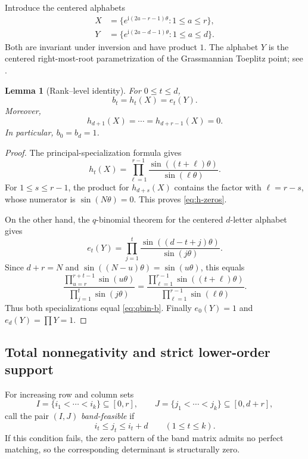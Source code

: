 \documentclass[11pt]{amsart}
\newtheorem{lemma}[theorem]{Lemma}
\theoremstyle{definition}
\theoremstyle{remark}
\begin{document}
Introduce the centered alphabets
\begin{align}
 X&=\bigl\{e^{\mathrm i(2a-r-1)\theta}:1\le a\le r\bigr\},\label{eq:X-alphabet}\\
 Y&=\bigl\{e^{\mathrm i(2a-d-1)\theta}:1\le a\le d\bigr\}.
 \label{eq:Y-alphabet}
\end{align}
Both are invariant under inversion and have product $1$.  The alphabet $Y$ is the centered right-most-root parametrization of the Grassmannian Toeplitz point; see \cite{RietschGrassmannian,ChungHalpernRietsch}.

\begin{lemma}[Rank--level identity]\label{lem:rank-level}
For $0\le t\le d$,
\begin{equation}\label{eq:rank-level-id}
 b_t=h_t(X)=e_t(Y).
\end{equation}
Moreover,
\begin{equation}\label{eq:h-zeros}
 h_{d+1}(X)=\cdots=h_{d+r-1}(X)=0.
\end{equation}
In particular, $b_0=b_d=1$.
\end{lemma}

\begin{proof}
The principal-specialization formula gives
\[
 h_t(X)=\prod_{\ell=1}^{r-1}
 \frac{\sin((t+\ell)\theta)}{\sin(\ell\theta)}.
\]
For $1\le s\le r-1$, the product for $h_{d+s}(X)$ contains the factor with $\ell=r-s$, whose numerator is $\sin(N\theta)=0$.  This proves \eqref{eq:h-zeros}.

On the other hand, the $q$-binomial theorem for the centered $d$-letter alphabet gives
\[
 e_t(Y)=\prod_{j=1}^t
 \frac{\sin((d-t+j)\theta)}{\sin(j\theta)}.
\]
Since $d+r=N$ and $\sin((N-u)\theta)=\sin(u\theta)$, this equals
\[
 \frac{\prod_{u=r}^{r+t-1}\sin(u\theta)}
 {\prod_{j=1}^{t}\sin(j\theta)}
 =\frac{\prod_{\ell=1}^{r-1}\sin((t+\ell)\theta)}
 {\prod_{\ell=1}^{r-1}\sin(\ell\theta)}.
\]
Thus both specializations equal \eqref{eq:qbin-b}.  Finally $e_0(Y)=1$ and $e_d(Y)=\prod Y=1$.
\end{proof}

\subsection{Total nonnegativity and strict lower-order support}

For increasing row and column sets
\[
 I=\{i_1<\cdots<i_k\}\subseteq[0,r],
 \qquad
 J=\{j_1<\cdots<j_k\}\subseteq[0,d+r],
\]
call the pair $(I,J)$ \emph{band-feasible} if
\begin{equation}\label{eq:band-feasible}
 i_t\le j_t\le i_t+d
 \qquad(1\le t\le k).
\end{equation}
If this condition fails, the zero pattern of the band matrix admits no perfect matching, so the corresponding determinant is structurally zero.
\end{document}
